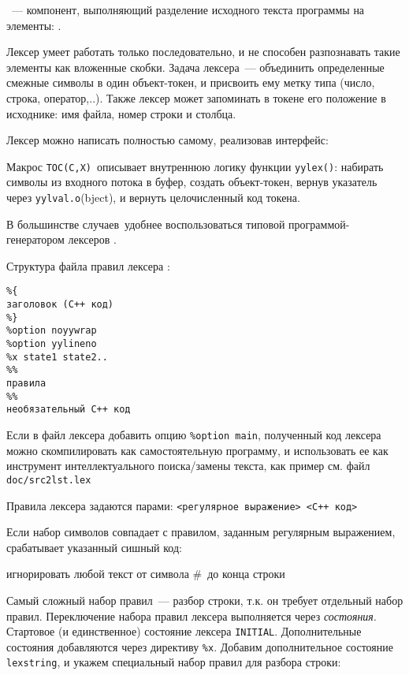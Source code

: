 \secdown


\ --- компонент, выполняющий разделение исходного 
текста программы на элементы: .

\bigskip
Лексер умеет работать только последовательно, и не способен разпознавать такие
элементы как вложенные скобки. Задача лексера\ --- объединить определенные
смежные символы в один объект-токен, и присвоить ему метку типа (число, строка, 
оператор,..). Также лексер может запоминать в токене его положение в 
исходнике: имя файла, номер строки и столбца.

Лексер можно написать полностью самому, реализовав интерфейс:

Макрос \verb|TOC(C,X)|\ описывает внутреннюю логику функции \verb|yylex()|:
набирать символы из входного потока в буфер, создать объект-токен, вернув 
указатель через \verb|yylval.o|(bject), и вернуть целочисленный код токена.

\bigskip
В большинстве случаев\ удобнее воспользоваться типовой программой-генератором
лексеров .

Структура файла правил лексера :
\begin{verbatim}
%{
заголовок (С++ код)
%}
%option noyywrap
%option yylineno
%x state1 state2..
%%
правила
%%
необязательный С++ код
\end{verbatim}

Если в файл лексера добавить опцию \verb|%option main|, полученный код лексера
можно скомпилировать как самостоятельную программу, и использовать ее как
инструмент интеллектуального поиска/замены текста, как пример
см. файл \verb|doc/src2lst.lex|


Правила лексера задаются парами: \verb|<регулярное выражение> <C++ код>|

Если набор символов совпадает с правилом, заданным регулярным выражением,
срабатывает указанный сишный код:


игнорировать любой текст от символа \#\ до конца строки

\bigskip
Самый сложный набор правил\ --- разбор строки, т.к. он требует отдельный
набор правил. Переключение набора правил лексера выполняется через
\emph{состояния}. Стартовое (и единственное) состояние лексера \verb|INITIAL|.
Дополнительные состояния добавляются через директиву \verb|%x|. Добавим 
дополнительное состояние \verb|lexstring|, и укажем специальный набор правил
для разбора строки:

